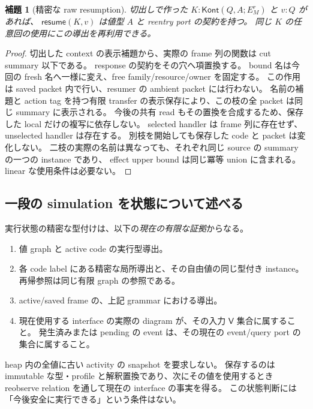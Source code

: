 \documentclass[11pt,a4paper]{article}
\newtheorem{lemma}[definition]{補題}
\newcommand{\Resume}{\mathsf{resume}}
\begin{document}
\begin{lemma}[精密な raw resumption]
切出しで作った \(K:\mathsf{Kont}(Q,A;E_M^r)\) と \(v:Q\) があれば、
\(\Resume(K,v)\) は値型 \(A\) と reentry port の契約を持つ。
同じ \(K\) の任意回の使用にこの導出を再利用できる。
\end{lemma}
\begin{proof}
切出した context の表示補題から、実際の frame 列の関数は cut summary 以下である。
response の契約をその穴へ項置換する。
bound 名は今回の fresh 名へ一様に変え、free family/resource/owner を固定する。
この作用は saved packet 内で行い、resumer の ambient packet には行わない。
名前の補題と action tag を持つ有限 transfer の表示保存により、この枝の全 packet は同じ summary に表示される。
今後の共有 read もその置換を合成するため、保存した local だけの複写に依存しない。
selected handler は frame 列に存在せず、unselected handler は存在する。
別枝を開始しても保存した code と packet は変化しない。
二枝の実際の名前は異なっても、それぞれ同じ source の summary の一つの instance であり、
effect upper bound は同じ冪等 union に含まれる。linear な使用条件は必要ない。
\end{proof}

\subsection{一段の simulation を状態について述べる}

実行状態の精密な型付けは、以下の\emph{現在の有限な証拠}からなる。
\begin{enumerate}
\item 値 graph と active code の実行型導出。
\item 各 code label にある精密な局所導出と、その自由値の同じ型付き instance。
      再帰参照は同じ有限 graph の参照である。
\item active/saved frame の、上記 grammar における導出。
\item 現在使用する interface の実際の diagram が、その入力 \(\mathsf V\) 集合に属すること。
      発生済みまたは pending の event は、その現在の event/query port の集合に属すること。
\end{enumerate}
heap 内の全値に古い activity の snapshot を要求しない。
保存するのは immutable な型・profile と解釈置換であり、次にその値を使用するとき
reobserve relation を通して現在の interface の事実を得る。
この状態判断には「今後安全に実行できる」という条件はない。
\end{document}
